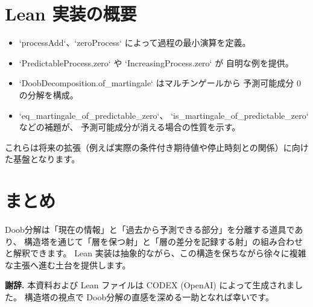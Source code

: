 \documentclass[12pt]{ltjsarticle}
\theoremstyle{definition}
\theoremstyle{plain}
\begin{document}
\section{Lean 実装の概要}

\begin{itemize}[leftmargin=1.4em]
  \item `processAdd`、`zeroProcess` によって過程の最小演算を定義。
  \item `PredictableProcess.zero` や `IncreasingProcess.zero` が
        自明な例を提供。
  \item `DoobDecomposition.of_martingale` はマルチンゲールから
        予測可能成分 $0$ の分解を構成。
  \item `eq_martingale_of_predictable_zero`、
        `is_martingale_of_predictable_zero` などの補題が、
        予測可能成分が消える場合の性質を示す。
\end{itemize}

これらは将来の拡張（例えば実際の条件付き期待値や停止時刻との関係）に向けた基盤となります。

\section{まとめ}

Doob分解は「現在の情報」と「過去から予測できる部分」を分離する道具であり、
構造塔を通じて「層を保つ射」と「層の差分を記録する射」の組み合わせと解釈できます。
Lean 実装は抽象的ながら、この構造を保ちながら徐々に複雑な主張へ進む土台を提供します。

\bigskip
\noindent\textbf{謝辞.}
本資料および Lean ファイルは CODEX (OpenAI) によって生成されました。
構造塔の視点で Doob分解の直感を深める一助となれば幸いです。
\end{document}
